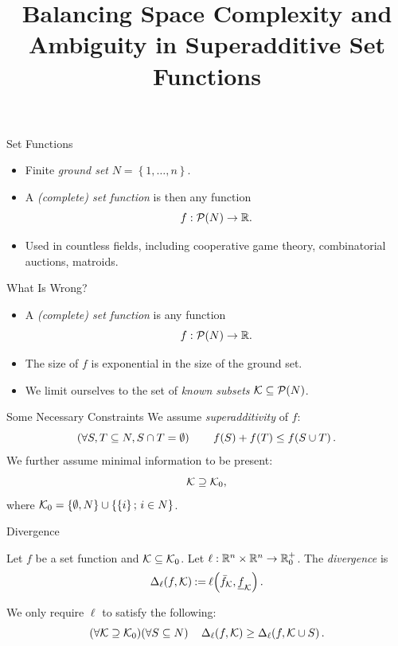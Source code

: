 \documentclass[aspectratio=169]{beamer}
\title{Balancing Space Complexity and Ambiguity in Superadditive Set Functions}
\begin{document}
\maketitle

\begin{frame}{Set Functions}
	\begin{itemize}
		\item<1-> Finite \emph{ground set} $ N = \left\{ 1, \ldots, n \right\} $.
		\item<2-> A \emph{(complete) set function} is then any function \[
			f: \mathcal{P}\!\left(N\right) \to \mathbb{R}.
		\]
		\item<3-> Used in countless fields, including cooperative game theory, combinatorial auctions, matroids.
	\end{itemize}
\end{frame}

\begin{frame}{What Is Wrong?}
	\begin{itemize}[ ]
		\item<1-> A \emph{(complete) set function} is any function \[
				f: \mathcal{P}\!\left(N\right) \to \mathbb{R}.
			\]
		\item<2-> The size of $ f $ is exponential in the size of the ground set.
		\item<3-> We limit ourselves to the set of \emph{known subsets} $ \mathcal{K} \subseteq \mathcal{P}\!\left(N\right) $.
	\end{itemize}
	
\end{frame}

\begin{frame}{Some Necessary Constraints}
	We assume \emph{superadditivity} of $ f $: \[
		\left( \forall S,T \subseteq N, S \cap T = \emptyset \right)\qquad f\!\left(S\right) + f\!\left(T\right) \leq f\!\left(S \cup T\right).
	\]
	We further assume minimal information to be present: \[
		\mathcal{K} \supseteq \mathcal{K}_0,
	\]
	where $ \mathcal{K}_0 = \left\{ \emptyset, N \right\} \cup \left\{ \left\{ i \right\} ;\, i \in N \right\} $.
\end{frame}



\begin{frame}{Divergence}
	\begin{definition}[Divergence]
		Let $ f $ be a set function and $ \mathcal{K} \subseteq \mathcal{K}_0 $.
		Let $ \ell: \mathbb{R}^n \times \mathbb{R}^n \to \mathbb{R}^+_0 $.
		The \emph{divergence} is \[
			\Delta_\ell\!\left(f, \mathcal{K}\right) \mathbin{:=} \ell\!\left(\bar f_{\mathcal{K}}, \underline f_{\mathcal{K}}\right).
		\]
	\end{definition}
	
	\vspace{2em}
	We only require $ \ell $ to satisfy the following: \[
		\left( \forall \mathcal{K} \supseteq \mathcal{K}_0 \right)\! \left( \forall S \subseteq N \right)\quad \Delta_\ell\!\left(f, \mathcal{K}\right) \geq \Delta_\ell\!\left(f, \mathcal{K} \cup S\right).
	\]
\end{frame}
\end{document}
